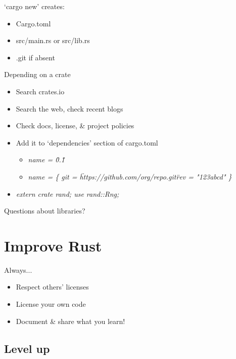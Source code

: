 \documentclass[50pt]{beamer}
\begin{document}
\begin{frame}
    `cargo new' creates:
    \begin{itemize}
        \item Cargo.toml
        \item src/main.rs or src/lib.rs
        \item .git if absent
    \end{itemize}
\end{frame}

\begin{frame}[fragile]
    Depending on a crate
    \begin{itemize}
        \item Search crates.io
        \item Search the web, check recent blogs
        \item Check docs, license, \& project policies
        \item Add it to `dependencies' section of cargo.toml
        \begin{itemize}
            \item \textit{ name = \"0.1\" }
            \item \textit{ name = \{ git = \"https://github.com/org/repo.git\" rev = "123abcd" \} }
        \end{itemize}
        \item \textit{ extern crate rand; use rand::Rng; }
    \end{itemize}
\end{frame}

\begin{frame}
    Questions about libraries?
\end{frame}

\section{Improve Rust}

\begin{frame}
    Always...
    \begin{itemize}
        \item Respect others' licenses
        \item License your own code
        \item Document \& share what you learn!
    \end{itemize}
\end{frame}


\subsection{Level up}
\end{document}
